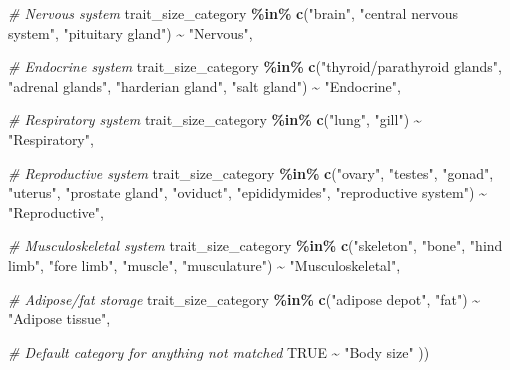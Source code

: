 \documentclass[
]{article}
\newenvironment{Shaded}{\begin{snugshade}}{\end{snugshade}}
\newcommand{\CommentTok}[1]{\textcolor[rgb]{0.56,0.35,0.01}{\textit{#1}}}
\newcommand{\ConstantTok}[1]{\textcolor[rgb]{0.56,0.35,0.01}{#1}}
\newcommand{\FunctionTok}[1]{\textcolor[rgb]{0.13,0.29,0.53}{\textbf{#1}}}
\newcommand{\NormalTok}[1]{#1}
\newcommand{\SpecialCharTok}[1]{\textcolor[rgb]{0.81,0.36,0.00}{\textbf{#1}}}
\newcommand{\StringTok}[1]{\textcolor[rgb]{0.31,0.60,0.02}{#1}}
\begin{document}
\begin{Shaded}
\begin{Highlighting}[]
    \CommentTok{\# Nervous system}
\NormalTok{    trait\_size\_category }\SpecialCharTok{\%in\%} \FunctionTok{c}\NormalTok{(}\StringTok{"brain"}\NormalTok{, }\StringTok{"central nervous system"}\NormalTok{, }
                              \StringTok{"pituitary gland"}\NormalTok{) }\SpecialCharTok{\textasciitilde{}} \StringTok{"Nervous"}\NormalTok{,}
    
    \CommentTok{\# Endocrine system}
\NormalTok{    trait\_size\_category }\SpecialCharTok{\%in\%} \FunctionTok{c}\NormalTok{(}\StringTok{"thyroid/parathyroid glands"}\NormalTok{, }\StringTok{"adrenal glands"}\NormalTok{,}
                              \StringTok{"harderian gland"}\NormalTok{, }\StringTok{"salt gland"}\NormalTok{) }\SpecialCharTok{\textasciitilde{}} \StringTok{"Endocrine"}\NormalTok{,}
    
    \CommentTok{\# Respiratory system}
\NormalTok{    trait\_size\_category }\SpecialCharTok{\%in\%} \FunctionTok{c}\NormalTok{(}\StringTok{"lung"}\NormalTok{, }\StringTok{"gill"}\NormalTok{) }\SpecialCharTok{\textasciitilde{}} \StringTok{"Respiratory"}\NormalTok{,}
    
    \CommentTok{\# Reproductive system}
\NormalTok{    trait\_size\_category }\SpecialCharTok{\%in\%} \FunctionTok{c}\NormalTok{(}\StringTok{"ovary"}\NormalTok{, }\StringTok{"testes"}\NormalTok{, }\StringTok{"gonad"}\NormalTok{, }\StringTok{"uterus"}\NormalTok{, }
                              \StringTok{"prostate gland"}\NormalTok{, }\StringTok{"oviduct"}\NormalTok{, }\StringTok{"epididymides"}\NormalTok{,}
                              \StringTok{"reproductive system"}\NormalTok{) }\SpecialCharTok{\textasciitilde{}} \StringTok{"Reproductive"}\NormalTok{,}
    
    \CommentTok{\# Musculoskeletal system}
\NormalTok{    trait\_size\_category }\SpecialCharTok{\%in\%} \FunctionTok{c}\NormalTok{(}\StringTok{"skeleton"}\NormalTok{, }\StringTok{"bone"}\NormalTok{, }\StringTok{"hind limb"}\NormalTok{, }\StringTok{"fore limb"}\NormalTok{,}
                              \StringTok{"muscle"}\NormalTok{, }\StringTok{"musculature"}\NormalTok{) }\SpecialCharTok{\textasciitilde{}} \StringTok{"Musculoskeletal"}\NormalTok{,}
    
    \CommentTok{\# Adipose/fat storage}
\NormalTok{    trait\_size\_category }\SpecialCharTok{\%in\%} \FunctionTok{c}\NormalTok{(}\StringTok{"adipose depot"}\NormalTok{, }\StringTok{"fat"}\NormalTok{) }\SpecialCharTok{\textasciitilde{}} \StringTok{"Adipose tissue"}\NormalTok{,}
    
    \CommentTok{\# Default category for anything not matched}
    \ConstantTok{TRUE} \SpecialCharTok{\textasciitilde{}} \StringTok{"Body size"}
\NormalTok{  ))}
\end{Highlighting}
\end{Shaded}
\end{document}
